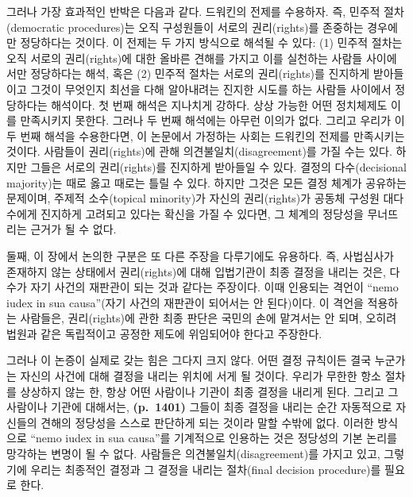 \documentclass[a4paper,12pt,oneside]{article}  %
\begin{document}
그러나 가장 효과적인 반박은 다음과 같다. 드워킨의 전제를 수용하자. 즉,
민주적 절차(democratic procedures)는 오직 구성원들이 서로의
권리(rights)를 존중하는 경우에만 정당하다는 것이다. 이 전제는 두 가지
방식으로 해석될 수 있다: (1) 민주적 절차는 오직 서로의 권리(rights)에
대한 올바른 견해를 가지고 이를 실천하는 사람들 사이에서만 정당하다는
해석, 혹은 (2) 민주적 절차는 서로의 권리(rights)를 진지하게 받아들이고
그것이 무엇인지 최선을 다해 알아내려는 진지한 시도를 하는 사람들
사이에서 정당하다는 해석이다. 첫 번째 해석은 지나치게 강하다. 상상
가능한 어떤 정치체제도 이를 만족시키지 못한다. 그러나 두 번째 해석에는
아무런 이의가 없다. 그리고 우리가 이 두 번째 해석을 수용한다면, 이
논문에서 가정하는 사회는 드워킨의 전제를 만족시키는 것이다. 사람들이
권리(rights)에 관해 의견불일치(disagreement)를 가질 수는 있다. 하지만
그들은 서로의 권리(rights)를 진지하게 받아들일 수 있다. 결정의
다수(decisional majority)는 때로 옳고 때로는 틀릴 수 있다. 하지만 그것은
모든 결정 체계가 공유하는 문제이며, 주제적 소수(topical minority)가
자신의 권리(rights)가 공동체 구성원 대다수에게 진지하게 고려되고 있다는
확신을 가질 수 있다면, 그 체계의 정당성을 무너뜨리는 근거가 될 수 없다.

둘째, 이 장에서 논의한 구분은 또 다른 주장을 다루기에도 유용하다. 즉,
사법심사가 존재하지 않는 상태에서 권리(rights)에 대해 입법기관이 최종
결정을 내리는 것은, 다수가 자기 사건의 재판관이 되는 것과 같다는
주장이다. 이때 인용되는 격언이 ``nemo iudex in sua causa''(자기 사건의
재판관이 되어서는 안 된다)이다. 이 격언을 적용하는 사람들은,
권리(rights)에 관한 최종 판단은 국민의 손에 맡겨서는 안 되며, 오히려
법원과 같은 독립적이고 공정한 제도에 위임되어야 한다고 주장한다.

그러나 이 논증이 실제로 갖는 힘은 그다지 크지 않다. 어떤 결정 규칙이든
결국 누군가는 자신의 사건에 대해 결정을 내리는 위치에 서게 될 것이다.
우리가 무한한 항소 절차를 상상하지 않는 한, 항상 어떤 사람이나 기관이
최종 결정을 내리게 된다. 그리고 그 사람이나 기관에 대해서는,
\textbf{(p.~1401)} 그들이 최종 결정을 내리는 순간 자동적으로 자신들의
견해의 정당성을 스스로 판단하게 되는 것이라 말할 수밖에 없다. 이러한
방식으로 ``nemo iudex in sua causa''를 기계적으로 인용하는 것은 정당성의
기본 논리를 망각하는 변명이 될 수 없다. 사람들은
의견불일치(disagreement)를 가지고 있고, 그렇기에 우리는 최종적인 결정과
그 결정을 내리는 절차(final decision procedure)를 필요로 한다.
\end{document}
